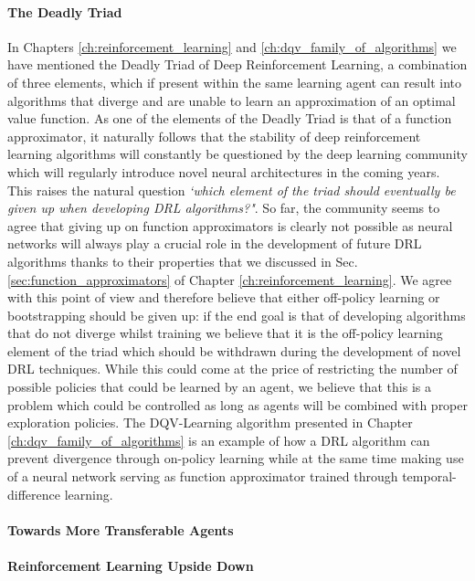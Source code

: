 \paragraph{The Deadly Triad}
In Chapters \ref{ch:reinforcement_learning} and \ref{ch:dqv_family_of_algorithms} we have mentioned the Deadly Triad of Deep Reinforcement Learning, a combination of three elements, which if present within the same learning agent can result into algorithms that diverge and are unable to learn an approximation of an optimal value function. As one of the elements of the Deadly Triad is that of a function approximator, it naturally follows that the stability of deep reinforcement learning algorithms will constantly be questioned by the deep learning community which will regularly introduce novel neural architectures in the coming years. This raises the natural question \textit{`which element of the triad should eventually be given up when developing DRL algorithms?"}. So far, the community seems to agree that giving up on function approximators is clearly not possible as neural networks will always play a crucial role in the development of future DRL algorithms \cite{van2018deep_triad,hernandez2019understanding,fedus2020revisiting} thanks to their properties that we discussed in Sec. \ref{sec:function_approximators} of Chapter \ref{ch:reinforcement_learning}. We agree with this point of view and therefore believe that either off-policy learning or bootstrapping should be given up: if the end goal is that of developing algorithms that do not diverge whilst training we believe that it is the off-policy learning element of the triad which should be withdrawn during the development of novel DRL techniques. While this could come at the price of restricting the number of possible policies that could be learned by an agent, we believe that this is a problem which could be controlled as long as agents will be combined with proper exploration policies. The DQV-Learning algorithm presented in Chapter \ref{ch:dqv_family_of_algorithms} is an example of how a DRL algorithm can prevent divergence through on-policy learning while at the same time making use of a neural network serving as function approximator trained through temporal-difference learning. 

\paragraph{Towards More Transferable Agents}

\paragraph{Reinforcement Learning Upside Down}

